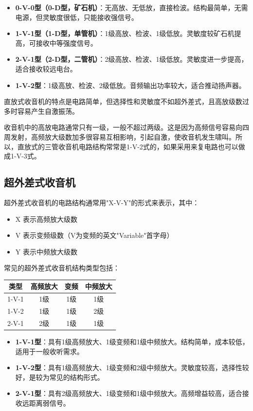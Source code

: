 \documentclass[12pt,UTF8]{ctexbook}
\begin{document}
\begin{itemize}[leftmargin=3.5em]
	\item \textbf{0-V-0型（0-D型，矿石机）}：无高放、无低放，直接检波。结构最简单，无需电源，但灵敏度很低，只能接收强信号。
	\item \textbf{1-V-1型（1-D型，单管机）}：1级高放、检波、1级低放。灵敏度较矿石机提高，可接收中等强度信号。
	\item \textbf{2-V-1型（2-D型，二管机）}：2级高放、检波、1级低放。灵敏度进一步提高，适合接收较远电台。
	\item \textbf{1-V-2型}：1级高放、检波、2级低放。音频输出功率较大，适合推动扬声器。
\end{itemize}

直放式收音机的特点是电路简单，但选择性和灵敏度不如超外差式，且高放级数过多时容易产生自激振荡。

收音机中的高放电路通常只有一级，一般不超过两级。这是因为高频信号容易向四周发射，高频放大级数加多很容易互相影响，引起自激，使收音机发生啸叫。所以，直放式的三管收音机电路结构常常是1-V-2式的，如果采用来复电路也可以做成1-V-3式。

\subsection{超外差式收音机}

超外差式收音机的电路结构通常用"X-V-Y"的形式来表示，其中：
\begin{itemize}[leftmargin=3.5em]
    \item X 表示高频放大级数
    \item V 表示变频级数（V为变频的英文"Variable"首字母）
    \item Y 表示中频放大级数
\end{itemize}

常见的超外差式收音机结构类型包括：

\begin{center}
\begin{tabular}{|c|c|c|c|}
\hline
\textbf{类型} & \textbf{高频放大} & \textbf{变频} & \textbf{中频放大} \\
\hline
1-V-1 & 1级 & 1级 & 1级 \\
\hline
1-V-2 & 1级 & 1级 & 2级 \\
\hline
2-V-1 & 2级 & 1级 & 1级 \\
\hline
\end{tabular}
\end{center}

\begin{itemize}[leftmargin=3.5em]
    \item \textbf{1-V-1型}：具有1级高频放大、1级变频和1级中频放大。结构简单，成本较低，适用于一般收听需求。
    \item \textbf{1-V-2型}：具有1级高频放大、1级变频和2级中频放大。灵敏度较高，选择性较好，是较为常见的结构形式。
    \item \textbf{2-V-1型}：具有2级高频放大、1级变频和1级中频放大。高频增益较高，适合接收远距离弱信号。
\end{itemize}
\end{document}

